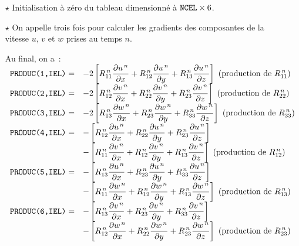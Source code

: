 \begin{itemize}
\item [$\star$] Initialisation à zéro du tableau  dimensionné à $\text{\texttt{NCEL}}\times 6$.
\item [$\star$] On appelle trois fois  pour calculer les gradients des composantes de la vitesse $u$, $v$ et
$w$ prises au temps $n$.

Au final, on a~:\\
$\displaystyle
\begin{array} {ll}
\text{\texttt{PRODUC(1,IEL)}} = & \displaystyle - 2 \left[ R_{11}^{\,n} \frac{\partial u^{\,n}} {\partial x} +R_{12}^{\,n} \frac{\partial u^{\,n}} {\partial y}+R_{13}^{\,n} \frac{\partial u^{\,n}} {\partial z} \right] \text{        (production de $R_{11}^{\,n}$)}\\
\text{\texttt{PRODUC(2,IEL)}} = & \displaystyle - 2 \left[ R_{12}^{\,n} \frac{\partial v^{\,n}} {\partial x} +R_{22}^{\,n} \frac{\partial v^{\,n}} {\partial y}+R_{23}^{\,n} \frac{\partial v^{\,n}} {\partial z} \right] \text{        (production de $R_{22}^{\,n}$)}\\
\text{\texttt{PRODUC(3,IEL)}} = & \displaystyle - 2 \left[ R_{13}^{\,n} \frac{\partial w^{\,n}} {\partial x} +R_{23}^{\,n} \frac{\partial w^{\,n}} {\partial y}+R_{33}^{\,n} \frac{\partial w^{\,n}} {\partial z} \right] \text{        (production de $R_{33}^{\,n}$)}\\
\text{\texttt{PRODUC(4,IEL)}} = & \displaystyle - \left[ R_{12}^{\,n} \frac{\partial u^{\,n}} {\partial x} +R_{22}^{\,n} \frac{\partial u^{\,n}} {\partial y}+R_{23}^{\,n} \frac{\partial u^{\,n}} {\partial z} \right] \\
& \displaystyle - \left[ R_{11}^{\,n} \frac{\partial v^{\,n}} {\partial x} +R_{12}^{\,n} \frac{\partial v^{\,n}} {\partial y}+R_{13}^{\,n} \frac{\partial v^{\,n}} {\partial z} \right] \text{        (production de $R_{12}^{\,n}$)} \\
\text{\texttt{PRODUC(5,IEL)}} = & \displaystyle - \left[ R_{13}^{\,n} \frac{\partial u^{\,n}} {\partial x} +R_{23}^{\,n} \frac{\partial u^{\,n}} {\partial y}+R_{33}^{\,n} \frac{\partial u^{\,n}} {\partial z} \right] \\
& \displaystyle - \left[ R_{11}^{\,n} \frac{\partial w^{\,n}} {\partial x} +R_{12}^{\,n} \frac{\partial w^{\,n}} {\partial y}+R_{13}^{\,n} \frac{\partial w^{\,n}} {\partial z} \right] \text{        (production de $R_{13}^{\,n}$)} \\
\text{\texttt{PRODUC(6,IEL)}} = & \displaystyle - \left[ R_{13}^{\,n} \frac{\partial v^{\,n}} {\partial x} +R_{23}^{\,n} \frac{\partial v^{\,n}} {\partial y}+R_{33}^{\,n} \frac{\partial v^{\,n}} {\partial z} \right] \\
& \displaystyle - \left[ R_{12}^{\,n} \frac{\partial w^{\,n}} {\partial x} +R_{22}^{\,n} \frac{\partial w^{\,n}} {\partial y}+R_{23}^{\,n} \frac{\partial w^{\,n}} {\partial z} \right]  \text{        (production de $R_{23}^{\,n}$)}
\end{array}
$
\end{itemize}


